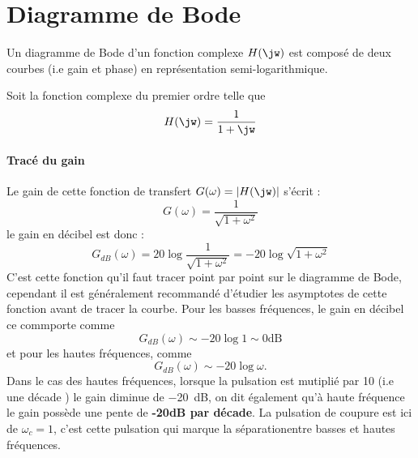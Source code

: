 \section{Diagramme de Bode}

Un diagramme de Bode d'un fonction complexe $H(\jw)$ est composé de deux 
courbes (i.e gain et phase) en représentation semi-logarithmique.

Soit la fonction complexe du premier ordre telle que 
\begin{align}
H(\jw)=\dfrac{1}{1+\jw}\label{eq-ft_annexe}
\end{align}

\paragraph{Tracé du gain}
Le gain de cette fonction de transfert $G(\omega)=|H(\jw)|$ s'écrit :
$$
G(\omega)=\dfrac{1}{\sqrt{1+\omega^2}}
$$
le gain en décibel est donc :
$$
G_{dB}(\omega)=20\log{\dfrac{1}{\sqrt{1+\omega^2}}}=-20\log{\sqrt{1+\omega^2}}
$$
C'est cette fonction qu'il faut tracer point par point sur le diagramme 
de Bode, cependant il est généralement recommandé d'étudier les asymptotes 
de cette fonction avant de tracer la courbe. Pour les basses fréquences, le 
gain en décibel ce commporte comme 
$$
G_{dB}(\omega)\sim-20\log{1}\sim 0\text{dB}
$$ 
et pour les hautes fréquences, comme
$$
G_{dB}(\omega)\sim -20\log{\omega}.
$$
Dans le cas des hautes fréquences, lorsque la pulsation est mutiplié par 
10 (i.e une décade ) le gain diminue de \SI{-20}{\dB}, on dit également 
qu'à haute fréquence le gain possède une pente de \textbf{-20dB par décade}. 
La pulsation de coupure est ici de $\omega_{c}=1$, c'est cette pulsation qui 
marque la \og séparation\fg entre basses et hautes fréquences. 


